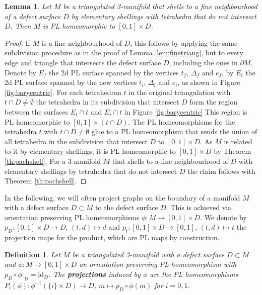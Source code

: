 \documentclass[1.5pt, a4paper]{article}
\newcommand{\inv}[0]{{-1}}
\newtheorem{lemma}[theorem]{Lemma}
\newtheorem{definition}[theorem]{Definition}
\begin{document}
\begin{lemma}\label{lem:finenbtop}
Let $M$ be a triangulated 3-manifold that shells to  a fine neighbourhood of a defect surface $D$  by elementary shellings with tetrahedra that do not intersect $D$. Then $M$  is PL homeomorphic to $[0,1]\times D$.
\end{lemma}

\begin{proof} If $M$ is a fine neighbourhood of $D$, this follows by applying  the same subdivision procedure as in the proof of Lemma \ref{lem:finetriang}, but to every edge and triangle that intersects the defect surface $D$, including the ones in $\partial M$.  Denote by $E_f$ the 2d PL surface spanned by the vertices $t_f$, $\Delta_f$ and $e_f$,  by $E_i$ the 2d PL surface spanned by the new vertices $t_i$, $\Delta_i$ and $e_i$, as shown in Figure \ref{fig:barycentric}. For each tetrahedron $t$ in the original triangulation  with $t\cap D\neq \emptyset$  the tetrahedra in its subdivision that intersect $D$ form  the region between the surfaces $E_t\cap t$ and $E_i\cap t$ in Figure \ref{fig:barycentric} This region  is PL homeomorphic to $[0,1]\times (t\cap D)$.  
The PL homeomorphisms for the tetrahedra $t$ with $t\cap D\neq \emptyset$ glue to a PL homeomorphism that sends the union  of all tetrahedra in the subdivision that intersect $D$  to $[0,1]\times D$.  As $M$ is related to it by elementary shellings, it is PL homeomorphic to $[0,1]\times D$ by Theorem \ref{th:pachshell}.
For a 3-manifold $M$  that shells to a fine neighbourhood of $D$ with elementary shellings by tetrahedra that do not intersect $D$ the claim follows  with Theorem \ref{th:pachshell}.
\end{proof}


In the following, we will often project graphs on the boundary of a manifold $M$ with a defect surface $D\subset M$ to the defect surface $D$. This is achieved via  orientation preserving  PL homeomorphisms $\phi: M\to [0,1]\times D$. We denote by $p_D: [0,1]\times D\to  D$, $(t,d)\mapsto d$ and $p_t:[0,1]\times D\to [0,1]$, $(t,d)\mapsto t$ the projection maps for the product, which are PL maps by construction. 


\begin{definition} \label{def:projection}Let $M$ be a triangulated 3-manifold with a defect surface $D\subset M$  and 
$\phi: M\to [0,1]\times D$ an orientation preserving PL homeomorphism with $p_D\circ \phi\vert_D=\mathrm{id}_D$. 
The {\bf  projections} induced by $\phi$ are the PL homeomorphisms
$P_i(\phi): \phi^\inv(\{i\}\times D)\to D$, $m\mapsto p_D\circ \phi(m)$ for $ i=0,1$.
\end{definition}
\end{document}
